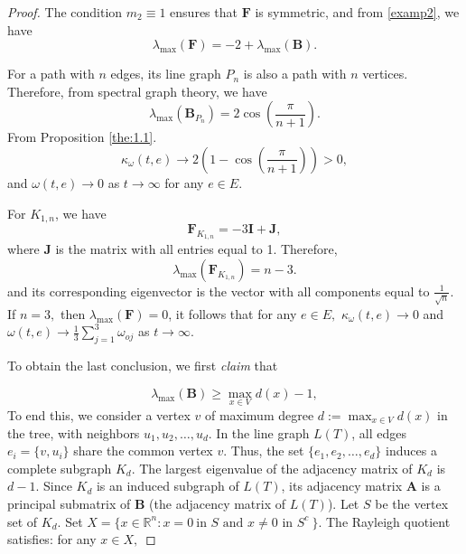 \documentclass{article}
\begin{document}
\begin{proof}
The condition  $m_2\equiv1$ ensures that  $\mathbf{F}$ is symmetric, and from \eqref{examp2}, we have 
\[\lambda_{\max}(\mathbf{F})=-2+\lambda_{\max}(\mathbf{B}).\]





For a path with $n$ edges, its line graph $P_{n}$ is also a path with \(n\) vertices.  Therefore, from spectral graph theory, we have 
\[
\lambda_{\max}(\mathbf{B}_{P_{n}}) = 2\cos\left(\frac{\pi}{n+1}\right).
\]
From Proposition \ref{the:1.1}.
\[\kappa_{\omega}(t,e)\rightarrow2\left(1-\cos\left(\frac{\pi}{n+1}\right)\right)>0, \]
and $\omega(t,e)\rightarrow 0$ as $t\rightarrow \infty$ for any $e\in E$.

For $K_{1,n}$,  we have
    \[\mathbf{F}_{K_{1,n}}=-3\mathbf{I}+\mathbf{J},\]
where $\mathbf{J}$ is the matrix with all entries equal to 1.
Therefore,
\[\lambda_{\max}(\mathbf{F}_{K_{1,n}})=n-3.\]
and its corresponding eigenvector is the vector with all components equal to $\frac{1}{\sqrt{n}}$. If $n=3,$ then $\lambda_{\max}(\mathbf{F})=0$, it follows that for any $e\in E,$ 
$\kappa_{\omega}(t,e)\rightarrow 0 $
and
$\omega(t,e)\rightarrow\frac{1}{3}\sum_{j=1}^{3}\omega_{oj}$ as $t\rightarrow \infty$.

To obtain the last conclusion, 
we first  {\it claim} that 

\[\lambda_{\max}(\mathbf{B})\geq\max_{x\in V}d(x)-1,\]
To end this, we consider a vertex $v$ of maximum degree $d:=\max_{x\in V}d(x)$ in the tree, with neighbors $u_1, u_2, \ldots, u_{d}$. In the line graph $L(T)$, all edges $e_i=\{v, u_i\}$ share the common vertex $v$. Thus, the set $\{e_1, e_2, \ldots, e_{d}\}$ induces a complete subgraph $K_d$. The largest eigenvalue of the adjacency matrix of $K_d$ is $d- 1$. Since $K_d$ is an induced subgraph of $L(T)$, its adjacency matrix $\mathbf{A}$ is a principal submatrix of $\mathbf{B}$ (the adjacency matrix of $L(T)$).  Let $S$ be the vertex set of $K_d$. Set $X=\{x\in \mathbb{R}^{n}: x=0 ~\mbox{in $S$ and $x\neq 0$ in $S^c$}~\}$. The Rayleigh quotient satisfies: for any $x\in X,$


\end{proof}
\end{document}
